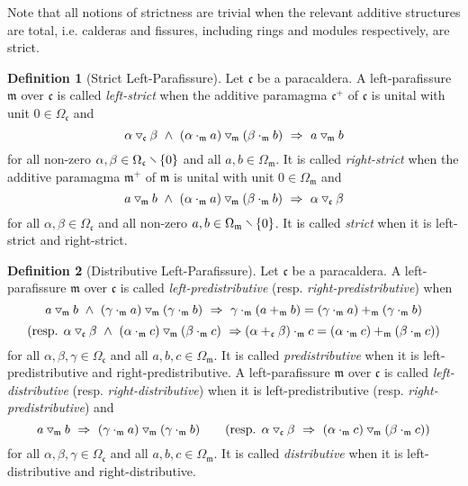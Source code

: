 \documentclass{article}
\theoremstyle{definition}
\newtheorem{definition}{Definition}[section]
\newcommand{\impl}{~\Rightarrow~}
\newcommand{\conj}{~\land~}
\newcommand{\tridown}{\mathbin{\hspace{.1em}\raisebox{.02em}{\rotatebox[origin=c]{90}{$\triangleleft$}}}}
\newcommand{\comp}{\tridown}
\newcommand{\diff}{\mathbin{\hspace{-.2em}\raisebox{.06em}{\rotatebox[origin=c]{-45}{$-$}\hspace{-.24em}}}}
\begin{document}
Note that all notions of strictness are trivial when the relevant additive structures are total, i.e. calderas and fissures, including rings and modules respectively, are strict.

\begin{definition}[Strict Left-Parafissure]
Let \(\mathfrak{c}\) be a paracaldera. A left-parafissure \(\mathfrak{m}\) over \(\mathfrak{c}\) is called \textit{left-strict} when the additive paramagma \(\mathfrak{c}^+\) of \(\mathfrak{c}\) is unital with unit \(0\in\Omega_\mathfrak{c}\) and \[\alpha\comp_\mathfrak{c}\beta\conj(\alpha\cdot_\mathfrak{m}a)\comp_\mathfrak{m}(\beta\cdot_\mathfrak{m}b)\impl a\comp_\mathfrak{m}b\] for all non-zero \(\alpha,\beta\in\Omega_\mathfrak{c}\diff\{0\}\) and all \(a,b\in\Omega_\mathfrak{m}\). It is called \textit{right-strict} when the additive paramagma \(\mathfrak{m}^+\) of \(\mathfrak{m}\) is unital with unit \(0\in\Omega_\mathfrak{m}\) and \[a\comp_\mathfrak{m}b\conj(\alpha\cdot_\mathfrak{m}a)\comp_\mathfrak{m}(\beta\cdot_\mathfrak{m}b)\impl\alpha\comp_\mathfrak{c}\beta\] for all \(\alpha,\beta\in\Omega_\mathfrak{c}\) and all non-zero \(a,b\in\Omega_\mathfrak{m}\diff\{0\}\). It is called \textit{strict} when it is left-strict and right-strict.
\end{definition}

\begin{definition}[Distributive Left-Parafissure]
Let \(\mathfrak{c}\) be a paracaldera. A left-parafissure \(\mathfrak{m}\) over \(\mathfrak{c}\) is called \textit{left-predistributive} (resp. \textit{right-predistributive}) when \[a\comp_\mathfrak{m}b\conj(\gamma\cdot_\mathfrak{m}a)\comp_\mathfrak{m}(\gamma\cdot_\mathfrak{m}b)\impl\gamma\cdot_\mathfrak{m}(a+_\mathfrak{m}b)=(\gamma\cdot_\mathfrak{m}a)+_\mathfrak{m}(\gamma\cdot_\mathfrak{m}b)\]\[(\text{resp. }\alpha\comp_\mathfrak{c}\beta\conj(\alpha\cdot_\mathfrak{m}c)\comp_\mathfrak{m}(\beta\cdot_\mathfrak{m}c)\impl\\(\alpha+_\mathfrak{c}\beta)\cdot_\mathfrak{m}c=(\alpha\cdot_\mathfrak{m}c)+_\mathfrak{m}(\beta\cdot_\mathfrak{m}c))\] for all \(\alpha,\beta,\gamma\in\Omega_\mathfrak{c}\) and all \(a,b,c\in\Omega_\mathfrak{m}\). It is called \textit{predistributive} when it is left-predistributive and right-predistributive. A left-parafissure \(\mathfrak{m}\) over \(\mathfrak{c}\) is called \textit{left-distributive} (resp. \textit{right-distributive}) when it is left-predistributive (resp. \textit{right-predistributive}) and \[a\comp_\mathfrak{m}b\impl(\gamma\cdot_\mathfrak{m}a)\comp_\mathfrak{m}(\gamma\cdot_\mathfrak{m}b)\qquad(\text{resp. }\alpha\comp_\mathfrak{c}\beta\impl(\alpha\cdot_\mathfrak{m}c)\comp_\mathfrak{m}(\beta\cdot_\mathfrak{m}c))\] for all \(\alpha,\beta,\gamma\in\Omega_\mathfrak{c}\) and all \(a,b,c\in\Omega_\mathfrak{m}\). It is called \textit{distributive} when it is left-distributive and right-distributive.
\end{definition}
\end{document}
